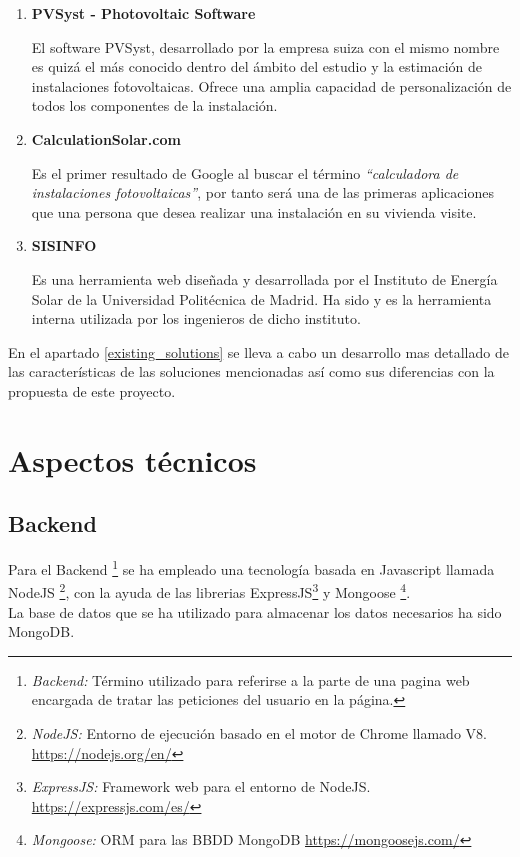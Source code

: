 \documentclass[11pt]{report}
\begin{document}
\begin{enumerate}
\item \textbf{PVSyst - Photovoltaic Software}

El software PVSyst, desarrollado por la empresa suiza con el mismo nombre es quizá el más conocido dentro del ámbito del estudio y la estimación de instalaciones fotovoltaicas. Ofrece una amplia capacidad de personalización de todos los componentes de la instalación.

\item \textbf{CalculationSolar.com}

Es el primer resultado de Google al buscar el término \textit{``calculadora de instalaciones fotovoltaicas''}, por tanto será una de las primeras aplicaciones que una persona que desea realizar una instalación en su vivienda visite.

\item \textbf{SISINFO}

Es una herramienta web diseñada y desarrollada por el Instituto de Energía Solar de la Universidad Politécnica de Madrid. Ha sido y es la herramienta interna utilizada por los ingenieros de dicho instituto.

\end{enumerate}

En el apartado \ref{existing_solutions}  se lleva a cabo un desarrollo mas detallado de las características de las soluciones mencionadas así como sus diferencias con la propuesta de este proyecto.

\section{Aspectos técnicos}

\subsection{Backend}

Para el Backend \footnote{\textit{Backend:} Término utilizado para referirse a la parte de una pagina web encargada de tratar las peticiones del usuario en la página.} se ha empleado una tecnología basada en Javascript llamada NodeJS \footnote{\textit{NodeJS:} Entorno de ejecución basado en el motor de Chrome llamado V8. \url{https://nodejs.org/en/} }, con la ayuda de las librerias ExpressJS\footnote{\textit{ExpressJS:} Framework web para el entorno de NodeJS. \url{https://expressjs.com/es/}} y Mongoose \footnote{\textit{Mongoose:} ORM para las BBDD MongoDB \url{https://mongoosejs.com/}}.   \\
La base de datos que se ha utilizado para almacenar los datos necesarios ha sido MongoDB.
\end{document}
